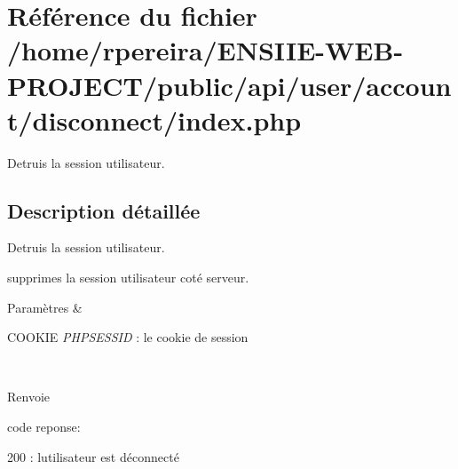 \hypertarget{account_2disconnect_2index_8php}{}\section{Référence du fichier /home/rpereira/\+E\+N\+S\+I\+I\+E-\/\+W\+E\+B-\/\+P\+R\+O\+J\+E\+C\+T/public/api/user/account/disconnect/index.php}
\label{account_2disconnect_2index_8php}


Detruis la session utilisateur.  




\subsection{Description détaillée}
Detruis la session utilisateur. 

supprimes la session utilisateur coté serveur. 
\begin{DoxyParams}{Paramètres}
{\em } & 
\begin{DoxyItemize}
\item C\+O\+O\+K\+IE {\itshape P\+H\+P\+S\+E\+S\+S\+ID} \+: le cookie de session 
\end{DoxyItemize}\\
\hline
\end{DoxyParams}
\begin{DoxyReturn}{Renvoie}

\begin{DoxyItemize}
\item code reponse\+:
\begin{DoxyItemize}
\item 200 \+: l\textquotesingle{}utilisateur est déconnecté 
\end{DoxyItemize}
\end{DoxyItemize}
\end{DoxyReturn}
